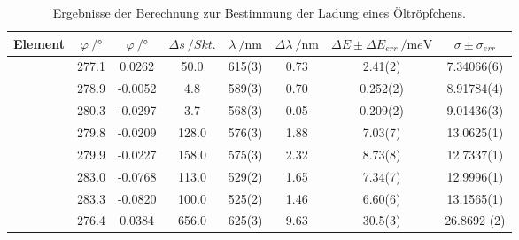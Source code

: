 \begin{table}
\centering
\begin{tabular}{S  S[table-format=3.1] S[table-format=1.4] S[table-format=3.1] S[table-format=1.0(1)] S[table-format=1.0] S[table-format=1.3(1)] S[table-format=1.5(1)] }
\toprule
{Element} & {$\varphi\:/\si\degree$} & {$\varphi\:/\si\degree$} & {$\Delta{s}\:/Skt.$}& {$\lambda\:/\si{\nano\meter}$} & {$\Delta{\lambda}\:/\si{\nano\meter}$}&{$\Delta{E}\pm\Delta{E_{err}}\:/\si{\milli}e\si\volt$}&{$\sigma\pm\sigma_{err}$}\\
\midrule
{}  & 277.1 &  0.0262 &  50.0 & 615(3) & 0.73 &  2.41(2)    &   7.34066(6)  \\
           & 278.9 & -0.0052 &   4.8 & 589(3) & 0.70 &  0.252(2)   &   8.91784(4)  \\
           & 280.3 & -0.0297 &   3.7 & 568(3) & 0.05 &  0.209(2)   &   9.01436(3)  \\
  & 279.8 & -0.0209 & 128.0 & 576(3) & 1.88 &  7.03(7)    &  13.0625(1)    \\
           & 279.9 & -0.0227 & 158.0 & 575(3) & 2.32 &  8.73(8)    &  12.7337(1)  \\
           & 283.0 & -0.0768 & 113.0 & 529(2) & 1.65 &  7.34(7)    &  12.9996(1)  \\
           & 283.3 & -0.0820 & 100.0 & 525(2) & 1.46 &  6.60(6)    &  13.1565(1)    \\
  & 276.4 &  0.0384 & 656.0 & 625(3) & 9.63 & 30.5(3)     &  26.8692 (2)   \\
\bottomrule
\end{tabular}
\caption{Ergebnisse der Berechnung zur Bestimmung der Ladung eines Öltröpfchens.}
\end{table}


